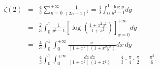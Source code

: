 \begin{eqnarray*}\zeta(2)&=&\frac{4}{3}\sum_{n=0}^{+\infty}\frac{1}{(2n+1)^2}=\frac{4}{3}\int_{0}^{1}\frac{\log y}{y^2-1}dy\\&=&\frac{2}{3}\int_{0}^{1}\frac{1}{y^2-1}\left[\log\left(\frac{1+x^2 y^2}{1+x^2}\right)\right]_{x=0}^{+\infty}dy\\&=&\frac{4}{3}\int_{0}^{1}\int_{0}^{+\infty}\frac{x}{(1+x^2)(1+x^2 y^2)}dx\,dy\\&=&\frac{4}{3}\int_{0}^{1}\int_{0}^{+\infty}\frac{dx\, dz}{(1+x^2)(1+z^2)}=\frac{4}{3}\cdot\frac{\pi}{4}\cdot\frac{\pi}{2}=\frac{\pi^2}{6}.\end{eqnarray*}